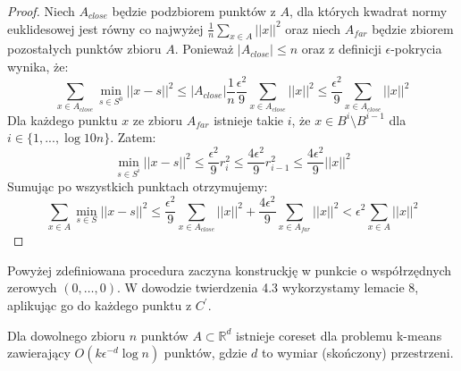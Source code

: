 \begin{proof}
    Niech $A_{close}$ będzie podzbiorem punktów z $A$, dla których kwadrat normy euklidesowej jest równy co najwyżej $\frac{1}{n}\sum_{x \in A}||x||^{2}$ oraz niech $A_{far}$ będzie zbiorem pozostałych punktów zbioru $A$.
    Ponieważ $|A_{close}| \leq n$ oraz z definicji $\epsilon$-pokrycia wynika, że:
    \begin{equation}
        \sum_{x\in A_{close}} \min_{s \in S^{0}} ||x - s||^{2} \leq |A_{close}|\frac{1}{n}\frac{\epsilon^{2}}{9}\sum_{x \in A_{close}}||x||^{2} \leq \frac{\epsilon^{2}}{9}\sum_{x \in A_{close}}||x||^{2}
    \end{equation}
    \noindent
    Dla każdego punktu $x$ ze zbioru $A_{far}$ istnieje takie $i$, że $x \in B^{i} \setminus B^{i-1}$ dla $i \in \{1, ..., \log10n \}$.
    Zatem:
    \begin{equation}
       \min_{s \in S^{i}} ||x - s||^{2} \leq \frac{\epsilon^{2}}{9} r_{i}^{2} \leq \frac{4\epsilon^{2}}{9} r_{i-1}^{2} \leq \frac{4\epsilon^{2}}{9} ||x||^2
    \end{equation}
    Sumując po wszystkich punktach otrzymujemy:
    \begin{equation}
        \sum_{x\in A} \min_{s \in S} ||x - s||^{2} \leq \frac{\epsilon^{2}}{9}\sum_{x \in A_{close}}||x||^{2} + \frac{4\epsilon^{2}}{9} \sum_{x \in A_{far}}||x||^2 < \epsilon^{2} \sum_{x \in A} ||x||^{2}
    \end{equation}
\end{proof}
\noindent
Powyżej zdefiniowana procedura zaczyna konstruckję w punkcie o współrzędnych zerowych $(0, \dots, 0)$.
W dowodzie twierdzenia 4.3 wykorzystamy lemacie 8, aplikując go do każdego punktu z $C^{'}$.
\begin{thm}
    Dla dowolnego zbioru $n$ punktów $A \subset \mathbb{R}^d$ istnieje coreset dla problemu k-means zawierający $O(k\epsilon^{-d} \log n)$ punktów, gdzie $d$ to wymiar (skończony) przestrzeni.
\end{thm}

